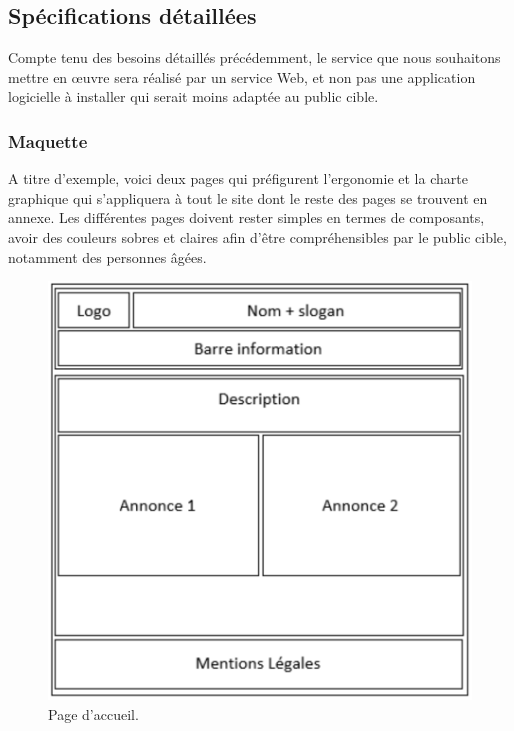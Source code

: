 \documentclass[a4paper,11pt]{article}
\begin{document}
\subsection{Spécifications détaillées}

Compte tenu des besoins détaillés précédemment, le service que nous souhaitons mettre en œuvre
sera réalisé par un service Web, et non pas une application logicielle à installer qui serait moins
adaptée au public cible.\\

\subsubsection{Maquette}

A titre d’exemple, voici deux pages qui préfigurent l’ergonomie et la charte graphique qui s’appliquera
à tout le site dont le reste des pages se trouvent en annexe. Les différentes pages doivent rester
simples en termes de composants, avoir des couleurs sobres et claires afin d’être compréhensibles
par le public cible, notamment des personnes âgées.\\

\begin{figure}[H]
  \includegraphics[width=\linewidth]{images/maquette-accueil.png}
  \caption{Page d'accueil.}
  \label{fig:maquette-accueil}
\end{figure}
\end{document}
